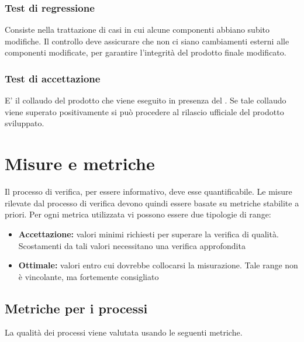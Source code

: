 \documentclass[12pt,a4paper]{article}
\begin{document}
\subsubsection{Test di regressione}
Consiste nella trattazione di casi in cui alcune componenti abbiano subito modifiche. Il controllo deve assicurare che non ci siano cambiamenti esterni alle componenti modificate, per garantire l'integrità del prodotto finale modificato.

\subsubsection{Test di accettazione}
E' il collaudo del prodotto  che viene eseguito in presenza del . Se tale collaudo viene superato positivamente si può procedere al rilascio ufficiale del prodotto sviluppato. 

\newpage
\section{Misure e metriche}\label{metriche}
Il processo di verifica, per essere informativo, deve esse quantificabile. Le misure rilevate dal processo di verifica devono quindi essere basate su metriche stabilite a priori. Per ogni metrica utilizzata vi possono essere due tipologie di range:

\begin{itemize}
	\item \textbf{Accettazione:} valori minimi richiesti per superare la verifica di qualità. Scostamenti da tali valori necessitano una verifica approfondita
	\item \textbf{Ottimale:} valori entro cui dovrebbe collocarsi la misurazione. Tale range non è vincolante, ma fortemente consigliato
\end{itemize}

\subsection{Metriche per i processi}\label{metriche_processi}
La qualità dei processi viene valutata usando le seguenti metriche.
\end{document}
